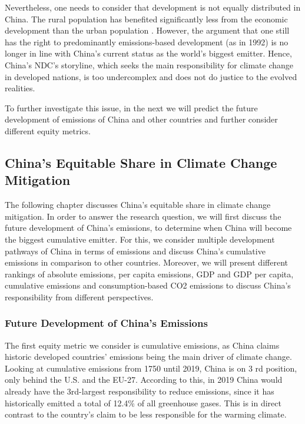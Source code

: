 \documentclass[
  12pt,
]{article}
\numberwithin{equation}{section}
\numberwithin{table}{section}
\numberwithin{figure}{section}
\begin{document}
Nevertheless, one needs to consider that development is not equally
distributed in China. The rural population has benefited significantly
less from the economic development than the urban population
\citep[East-West divide,][]{Knight2004}. However, the argument that one
still has the right to predominantly emissions-based development (as in
1992) is no longer in line with China's current status as the world's
biggest emitter. Hence, China's NDC's storyline, which seeks the main
responsibility for climate change in developed nations, is too
undercomplex and does not do justice to the evolved realities.

To further investigate this issue, in the next we will predict the
future development of emissions of China and other countries and further
consider different equity metrics.

\hypertarget{chinas-equitable-share-in-climate-change-mitigation}{%
\subsection{China's Equitable Share in Climate Change
Mitigation}\label{chinas-equitable-share-in-climate-change-mitigation}}

The following chapter discusses China's equitable share in climate
change mitigation. In order to answer the research question, we will
first discuss the future development of China's emissions, to determine
when China will become the biggest cumulative emitter. For this, we
consider multiple development pathways of China in terms of emissions
and discuss China's cumulative emissions in comparison to other
countries. Moreover, we will present different rankings of absolute
emissions, per capita emissions, GDP and GDP per capita, cumulative
emissions and consumption-based CO2 emissions to discuss China's
responsibility from different perspectives.

\hypertarget{future-development-of-chinas-emissions}{%
\subsubsection{Future Development of China's
Emissions}\label{future-development-of-chinas-emissions}}

The first equity metric we consider is cumulative emissions, as China
claims historic developed countries' emissions being the main driver of
climate change. Looking at cumulative emissions from 1750 until 2019,
China is on 3 rd position, only behind the U.S. and the EU-27. According
to this, in 2019 China would already have the 3rd-largest responsibility
to reduce emissions, since it has historically emitted a total of 12.4\%
of all greenhouse gases. This is in direct contrast to the country's
claim to be less responsible for the warming climate.
\end{document}
